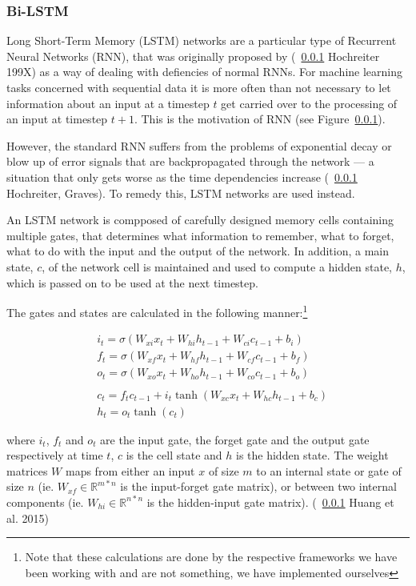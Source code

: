 \subsubsection{Bi-LSTM}

Long Short-Term Memory (LSTM) networks are a particular type of Recurrent Neural
Networks (RNN), that was originally proposed by (~\ref{} Hochreiter 199X) as a
way of dealing with defiencies of normal RNNs. For machine learning tasks
concerned with sequential data it is more often than not necessary to let
information about an input at a timestep $t$ get carried over to the processing
of an input at timestep $t+1$. This is the motivation of RNN (see
Figure~\ref{}).

However, the standard RNN suffers from the problems of exponential decay or blow
up of error signals that are backpropagated through the network --- a situation
that only gets worse as the time dependencies increase (~\ref{} Hochreiter,
Graves). To remedy this, LSTM networks are used instead.

An LSTM network is compposed of carefully designed memory cells containing
multiple gates, that determines what information to remember, what to forget,
what to do with the input and the output of the network. In addition, a main
state, $c$, of the network cell is maintained and used to compute a hidden
state, $h$, which is passed on to be used at the next timestep.

The gates and states are calculated in the following manner:\footnote{Note that
    these calculations are done by the respective frameworks we have been
working with and are not something, we have implemented ourselves}

\begin{align*}
    & i_{t} = \sigma(W_{xi}x_{t} + W_{hi}h_{t-1} + W_{ci}c_{t-1} + b_{i})    \\
    & f_{t} = \sigma(W_{xf}x_{t} + W_{hf}h_{t-1} + W_{cf}c_{t-1} + b_{f})    \\
    & o_{t} = \sigma(W_{xo}x_{t} + W_{ho}h_{t-1} + W_{co}c_{t-1} + b_{o})    \\ \\
    & c_{t} = f_{t}c_{t-1} + i_{t}\tanh(W_{xc}x_{t} + W_{hc}h_{t-1} + b_{c}) \\
    & h_{t} = o_{t}\tanh(c_{t})
\end{align*}

where $i_{t}$, $f_{t}$ and $o_{t}$ are the input gate, the forget gate and the
output gate respectively at time $t$, $c$ is the cell state and $h$ is the
hidden state. The weight matrices $W$ maps from either an input $x$ of size $m$
to an internal state or gate of size $n$ (ie. $W_{xf} \in \mathbb{R}^{m*n}$ is
the input-forget gate matrix), or between two internal components (ie. $W_{hi}
\in \mathbb{R}^{n*n}$ is the hidden-input gate matrix). (~\ref{} Huang et al.
2015)

